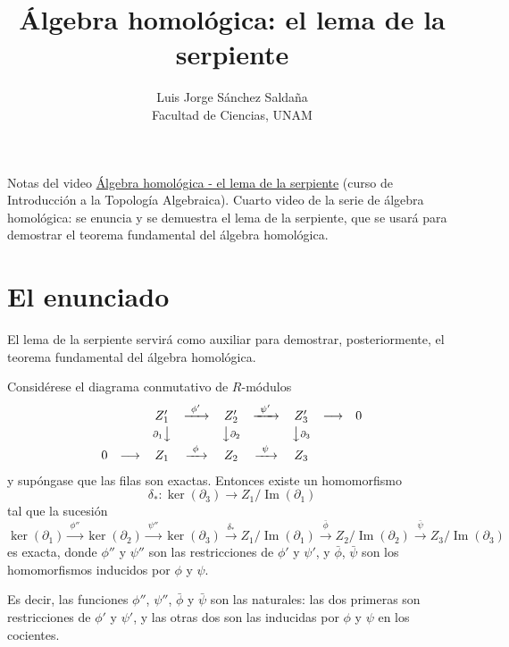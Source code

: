\documentclass[11pt]{article}
\title{Álgebra homológica: el lema de la serpiente}
\author{Luis Jorge Sánchez Saldaña\\[2pt]\small Facultad de Ciencias, UNAM}
\date{}
\begin{document}
\maketitle

\noindent\small Notas del video
\href{https://www.youtube.com/watch?v=Sot3oC0gpmI}{\guillemotleft{}Álgebra homológica - el lema de la serpiente\guillemotright{}}
(curso de Introducción a la Topología Algebraica). Cuarto video de la serie de álgebra homológica: se enuncia y se demuestra el lema de la serpiente, que se usará para demostrar el teorema fundamental del álgebra homológica.
\normalsize

\section*{El enunciado}

El lema de la serpiente servirá como auxiliar para demostrar, posteriormente, el teorema fundamental del álgebra homológica.

\begin{lema}\label{lema:serpiente}
Considérese el diagrama conmutativo de $R$-módulos
\[
  \begin{array}{ccccccccc}
    & & Z'_1 & \xrightarrow{\ \phi'\ } & Z'_2 & \xrightarrow{\ \psi'\ } & Z'_3 & \longrightarrow & 0\\[2pt]
    & & {\scriptstyle\partial_1}\big\downarrow & & \big\downarrow{\scriptstyle\partial_2} & & \big\downarrow{\scriptstyle\partial_3} & & \\[2pt]
    0 & \longrightarrow & Z_1 & \xrightarrow{\ \phi\ } & Z_2 & \xrightarrow{\ \psi\ } & Z_3 & &
  \end{array}
\]
y supóngase que las filas son exactas. Entonces existe un homomorfismo
\[
  \delta_*\colon\ker(\partial_3)\longrightarrow Z_1/\operatorname{Im}(\partial_1)
\]
tal que la sucesión
\[
  \ker(\partial_1)\xrightarrow{\ \phi''\ }\ker(\partial_2)\xrightarrow{\ \psi''\ }\ker(\partial_3)\xrightarrow{\ \delta_*\ }Z_1/\operatorname{Im}(\partial_1)\xrightarrow{\ \bar\phi\ }Z_2/\operatorname{Im}(\partial_2)\xrightarrow{\ \bar\psi\ }Z_3/\operatorname{Im}(\partial_3)
\]
es exacta, donde $\phi''$ y $\psi''$ son las restricciones de $\phi'$ y $\psi'$, y $\bar\phi$, $\bar\psi$ son los homomorfismos inducidos por $\phi$ y $\psi$.
\end{lema}

Es decir, las funciones $\phi''$, $\psi''$, $\bar\phi$ y $\bar\psi$ son las naturales: las dos primeras son restricciones de $\phi'$ y $\psi'$, y las otras dos son las inducidas por $\phi$ y $\psi$ en los cocientes.
\end{document}
